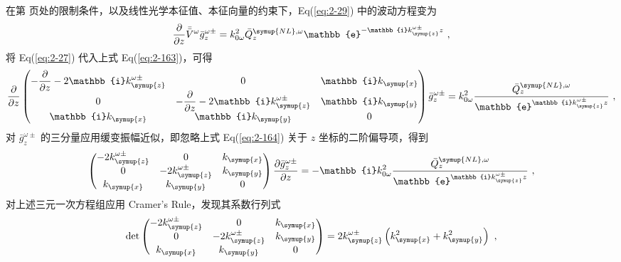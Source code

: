 在第 \pageref{con:1} 页处的限制条件，以及线性光学本征值、本征向量的约束下，Eq(\ref{eq:2-29}) 中的波动方程变为
\begin{equation} \label{eq:2-163}
	\displaystyle{\frac{\partial}{\partial z}} \bar{\bar{V}}^\omega \bar{g}^{\omega\pm}_z = k^{2}_{0\omega} {\bar{Q}^{{\symup{NL}},\omega}_z} \mathbb{e}^{-\mathbb{i} k^{\omega\pm}_{\symup{z}} z} ~,
\end{equation}
将 Eq(\ref{eq:2-27}) 代入上式 Eq(\ref{eq:2-163})，可得
\begin{equation} \label{eq:2-164}
	\displaystyle{\frac{\partial}{\partial z}} \begin{pmatrix} \displaystyle{- \frac{\partial}{\partial z}} - 2 \mathbb{i} k^{\omega\pm}_{\symup{z}} & 0 & \mathbb{i} k_{\symup{x}} \\ 0 & \displaystyle{- \frac{\partial}{\partial z}} - 2 \mathbb{i} k^{\omega\pm}_{\symup{z}} & \mathbb{i} k_{\symup{y}} \\ \mathbb{i} k_{\symup{x}} & \mathbb{i} k_{\symup{y}} & 0 \end{pmatrix} \bar{g}^{\omega\pm}_z = k^{2}_{0\omega} \frac{\bar{Q}^{{\symup{NL}},\omega}_z}{\mathbb{e}^{\mathbb{i} k^{\omega\pm}_{\symup{z}} z}} ~,
\end{equation}
对 $\bar{g}^{\omega\pm}_z$ 的三分量应用缓变振幅近似，即忽略上式 Eq(\ref{eq:2-164}) 关于 $z$ 坐标的二阶偏导项，得到
\begin{equation} \label{eq:2-165}
	\begin{pmatrix} - 2 k^{\omega\pm}_{\symup{z}} & 0 & k_{\symup{x}} \\ 0 & - 2 k^{\omega\pm}_{\symup{z}} & k_{\symup{y}} \\ k_{\symup{x}} & k_{\symup{y}} & 0 \end{pmatrix} \displaystyle{\frac{\partial \bar{g}^{\omega\pm}_z}{\partial z}} = - \mathbb{i} k^{2}_{0\omega} \frac{\bar{Q}^{{\symup{NL}},\omega}_z}{\mathbb{e}^{\mathbb{i} k^{\omega\pm}_{\symup{z}} z}} ~,
\end{equation}
对上述三元一次方程组应用 Cramer's Rule，发现其系数行列式
\begin{equation} \label{eq:2-166}
	\det \begin{pmatrix} - 2 k^{\omega\pm}_{\symup{z}} & 0 & k_{\symup{x}} \\ 0 & - 2 k^{\omega\pm}_{\symup{z}} & k_{\symup{y}} \\ k_{\symup{x}} & k_{\symup{y}} & 0 \end{pmatrix} = 2 k^{\omega\pm}_{\symup{z}} \left( k^2_{\symup{x}} + k^2_{\symup{y}} \right) ~,
\end{equation}
